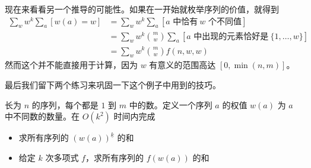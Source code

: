     现在来看看另一个推导的可能性。如果在一开始就枚举序列的价值，就得到
    $$
    \begin{aligned}
    \sum_w w^k\sum_a [w(a)=w]&=\sum_w w^k\sum_a [a\text{ 中恰有}\ w\text{ 个不同值}]\\
    &=\sum_w w^k\binom{m}{w}\sum_a[a\text{ 中出现的元素恰好是}\ \{1,\ldots,w\}]\\
    &=\sum_w w^k\binom{m}{w}f(n,w,w)
    \end{aligned}
    $$
    然而这个并不能直接用于计算，因为 $w$ 有意义的范围高达 $[0,\min(n,m)]$。

    最后我们留下两个练习来巩固一下这个例子中用到的技巧。
    \begin{exercise}
        长为 $n$ 的序列，每个都是 $1$ 到 $m$ 中的数。定义一个序列 $a$ 的权值 $w(a)$ 为 $a$ 中不同数的数量。在 $O(k^2)$ 时间内完成
        \begin{itemize}
            \item 求所有序列的 $(w(a))^{\underline{k}}$ 的和
            \item 给定 $k$ 次多项式 $f$，求所有序列的 $f(w(a))$ 的和
        \end{itemize}
    \end{exercise}
